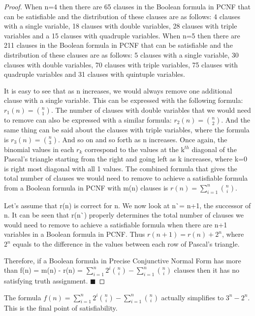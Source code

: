 \documentclass[runningheads,a4paper]{llncs}
\begin{document}
\begin{theorem}
\begin{proof}
When n=4 then there are 65 clauses in the Boolean formula in PCNF that can be satisfiable and the distribution of these clauses are as follows: 4 clauses with a single variable, 18 clauses with double variables, 28 clauses with triple variables and a 15 clauses with quadruple variables. When n=5 then there are 211 clauses in the Boolean formula in PCNF that can be satisfiable and the distribution of these clauses are as follows: 5 clauses with a single variable, 30 clauses with double variables, 70 clauses with triple variables, 75 clauses with quadruple variables and 31 clauses with quintuple variables. 

It is easy to see that as n increases, we would always remove one additional clause with a single variable. This can be expressed with the following formula: $r_{1}(n) = \binom{n} {1}$. The number of clauses with double variables that we would need to remove can also be expressed with a similar formula: $r_{2}(n) = \binom{n} {2}$. And the same thing can be said about the clauses with triple variables, where the formula is $r_{3}(n) = \binom{n} {3}$. And so on and so forth as n increases. Once again, the binomial values in each $r_{k}$ correspond to the values at the k$^{th}$ diagonal of the Pascal's triangle starting from the right and going left as k increases, where k=0 is right most diagonal with all 1 values. The combined formula that gives the total number of clauses we would need to remove to achieve a satisfiable formula from a Boolean formula in PCNF with m(n) clauses is  $ r(n) = \sum_{i=1}^{n} \binom{n} {i}$. 

Let's assume that r(n) is correct for n. We now look at n\`{}= n+1, the successor of n. It can be seen that r(n\`{}) properly determines the total number of clauses we would need to remove to achieve a satisfiable formula when there are n+1 variables in a Boolean formula in PCNF. Thus $r(n+1) = r(n) + 2^{n} $, where $2^{n}$ equals to the difference in the values between each row of Pascal's triangle. 

Therefore, if a Boolean formula in Precise Conjunctive Normal Form has more than f(n) = m(n) - r(n) = $\sum_{i=1}^{n} 2^{i} \binom{n} {i} - \sum_{i=1}^{n} \binom{n} {i}$ clauses then it has no satisfying truth assignment. $\blacksquare$

\end{proof}
\end{theorem}

The formula $ f(n) =  \sum_{i=1}^{n} 2^{i} \binom{n} {i} - \sum_{i=1}^{n} \binom{n} {i}$ actually simplifies to $3^{n}-2^{n}$. This is the final point of satisfiability. 
\end{document}
